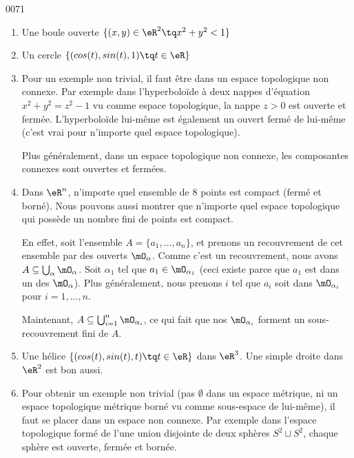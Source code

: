 
\begin{corrige}{0071}

\begin{enumerate}
	\item Une boule ouverte $\{ (x,y) \in \eR^2 \tq x^2+y^2 < 1\}$
	\item Un cercle $\{ (cos(t),sin(t),1) \tq t \in \eR\}$
	\item Pour un exemple non trivial, il faut être dans un espace topologique non connexe. Par exemple dans l'hyperboloïde à deux nappes d'équation $x^2 + y^2 = z^2 - 1$ vu comme espace topologique, la nappe $z > 0$ est ouverte et fermée. L'hyperboloïde lui-même est également un ouvert fermé de lui-même (c'est vrai pour n'importe quel espace topologique).

		Plus généralement, dans un espace topologique non connexe, les composantes connexes sont ouvertes et fermées.
	\item Dans $\eR^n$, n'importe quel ensemble de $8$ points est compact (fermé et borné). Nous pouvons aussi montrer que n'importe quel espace topologique qui possède un nombre fini de points est compact. 

En effet, soit l'ensemble $A=\{ a_1, \ldots, a_n \}$, et prenons un recouvrement de cet ensemble par des ouverts $\mO_{\alpha}$. Comme c'est un recouvrement, nous avons $A\subseteq\bigcup_{\alpha}\mO_{\alpha}$. Soit $\alpha_1$ tel que $a_1\in\mO_{\alpha_1}$ (ceci existe parce que $a_1$ est dans un des $\mO_{\alpha}$). Plus généralement, nous prenons $i$ tel que $a_i$ soit dans $\mO_{\alpha_i}$ pour $i=1, \ldots, n$.

Maintenant, $A\subseteq\bigcup_{i=1}^n\mO_{\alpha_i}$, ce qui fait que nos $\mO_{\alpha_i}$ forment un sous-recouvrement fini de $A$.

	\item Une hélice $\{ (cos(t),sin(t),t) \tq t \in \eR\}$ dans $\eR^3$. Une simple droite dans $\eR^2$ est bon aussi.
	\item Pour obtenir un exemple non trivial (pas $\emptyset$ dans un espace métrique, ni un espace topologique métrique borné vu comme sous-espace de lui-même), il faut se placer dans un espace non connexe. Par exemple dans l'espace topologique formé de l'une union disjointe de deux sphères $S^2 \sqcup S^2$, chaque sphère est ouverte, fermée et bornée.
\end{enumerate}

\end{corrige}
